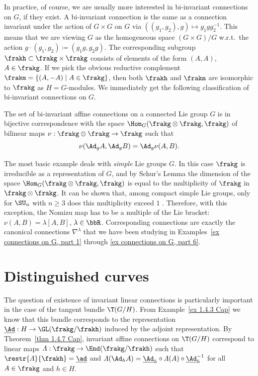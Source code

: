 In practice, of course, we are usually more interested in bi-invariant connections on $G$, if they exist. A bi-invariant connection is the same as a connection invariant under the action of $G\times G$ on $G$ via $((g_1,g_2),g)\mapsto g_1gg_2^{-1}$. This means that we are viewing $G$ as the homogeneous space $(G\times G)\slash G$ w.r.t.\ the action $g\cdot (g_1,g_2)\coloneqq (g_1g,g_2g)$. The corresponding subgroup $\frakh\subset\frakg\times\frakg$ consists of elements of the form $(A,A)$, $A\in\frakg$. If we pick the obvious reductive complement $\frakm=\{(A,-A)\mid A\in\frakg\}$, then both $\frakh$ and $\frakm$ are isomorphic to $\frakg$ as $H=G$-modules. We immediately get the following classification of bi-invariant connections on $G$.

\begin{cor}
    The set of bi-invariant affine connections on a connected Lie group $G$ is in bijective correspondence with the space $\Hom_G(\frakg\otimes\frakg,\frakg)$ of bilinear maps $\nu:\frakg\otimes\frakg\to \frakg$ such that 
    \[\nu(\Ad_g A,\Ad_g B)=\Ad_g \nu(A,B).\]
\end{cor}

The most basic example deals with \emph{simple} Lie groups $G$. In this case $\frakg$ is irreducible as a representation of $G$, and by Schur's Lemma the dimension of the space $\Hom_G(\frakg\otimes\frakg,\frakg)$ is equal to the multiplicity of $\frakg$ in $\frakg\otimes\frakg$. It can be shown that, among compact simple Lie groups, only for $\SU_n$ with $n\geq 3$ does this multiplicity exceed $1$ \cite{Laquer}. Therefore, with this exception, the Nomizu map has to be a multiple of the Lie bracket: $\nu(A,B)=\lambda[A,B]$, $\lambda\in\bbR$. Corresponding connections are exactly the canonical connections $\nabla^\lambda$ that we have been studying in Examples~\ref{ex connections on G, part 1} through \ref{ex connections on G, part 6}.







\section{Distinguished curves}


The question of existence of invariant linear connections is particularly important in the case of the tangent bundle $\T(G\slash H)$. From Example~\ref{ex 1.4.3 Cap} we know that this bundle corresponds to the representation $\underline{\Ad}:H\to \GL(\frakg\slash\frakh)$ induced by the adjoint representation. By Theorem~\ref{thm 1.4.7 Cap}, invariant affine connections on $\T(G\slash H)$ correspond to linear maps $\varLambda:\frakg\to \End(\frakg\slash\frakh)$ such that $\restr{\varLambda}{\frakh}=\underline{\ad}$ and $\varLambda(\Ad_h A)=\underline{\Ad}_h\circ\varLambda(A)\circ \underline{\Ad}_h^{-1}$ for all $A\in\frakg$ and $h\in H$.

